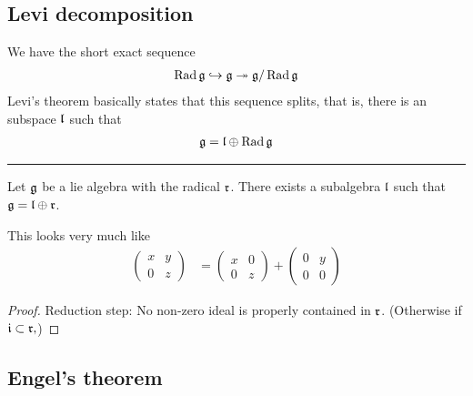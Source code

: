 \subsection{Levi decomposition}
\label{sub:levi_decomposition}

We have the short exact sequence
\begin{align}
    \operatorname{Rad} \mathfrak{g} \hookrightarrow \mathfrak{g} \twoheadrightarrow \mathfrak{g}/\operatorname{Rad}\mathfrak{g}
\end{align}
Levi's theorem basically states that this sequence splits, that is, there is an subspace $\mathfrak{l}$ such that
\begin{align}
    \mathfrak{g} = \mathfrak{l}\oplus\operatorname{Rad}\mathfrak{g}
\end{align}

\hrule\vspace{1em}

\begin{theorem}
   Let $\mathfrak{g}$  be a lie algebra with the radical $\mathfrak{r}$. There exists a subalgebra $\mathfrak{l}$ such that $\mathfrak{g} = \mathfrak{l} \oplus \mathfrak{r}$.
\end{theorem}
\begin{insight}
    This looks very much like 
    \begin{align}
        \begin{pmatrix}  x& y \\ 0 & z \end{pmatrix} &= \begin{pmatrix} x & 0 \\ 0 & z \end{pmatrix} + \begin{pmatrix} 0 & y \\ 0 & 0  \end{pmatrix}
    \end{align} 
\end{insight}
\begin{proof}
    Reduction step: No non-zero ideal is properly contained in $\mathfrak{r}$. (Otherwise if $\mathfrak{i}\subset \mathfrak{r}, $) 
\end{proof}

\subsection{Engel's theorem}
\label{sub:engel_s_theorem}

\begin{theorem}[Engel]
    
\end{theorem}





















